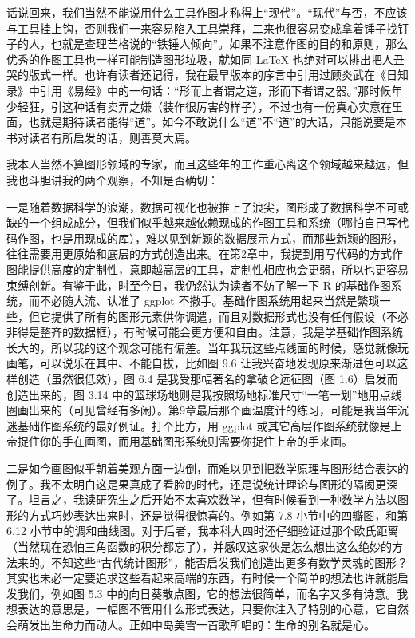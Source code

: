 \documentclass[
  b5paper,
  UTF8,twoside]{book}
\begin{document}
话说回来，我们当然不能说用什么工具作图才称得上``现代''。``现代''与否，不应该与工具挂上钩，否则我们一来容易陷入工具崇拜，二来也很容易变成拿着锤子找钉子的人，也就是查理芒格说的``铁锤人倾向''。如果不注意作图的目的和原则，那么优秀的作图工具也一样可能制造图形垃圾，就如同 LaTeX 也绝对可以排出把人丑哭的版式一样。也许有读者还记得，我在最早版本的序言中引用过顾炎武在《日知录》中引用《易经》中的一句话：``形而上者谓之道，形而下者谓之器。''那时候年少轻狂，引这种话有卖弄之嫌（装作很厉害的样子），不过也有一份真心实意在里面，也就是期待读者能得``道''。如今不敢说什么``道''不``道''的大话，只能说要是本书对读者有所启发的话，则善莫大焉。

我本人当然不算图形领域的专家，而且这些年的工作重心离这个领域越来越远，但我也斗胆讲我的两个观察，不知是否确切：

一是随着数据科学的浪潮，数据可视化也被推上了浪尖，图形成了数据科学不可或缺的一个组成成分，但我们似乎越来越依赖现成的作图工具和系统（哪怕自己写代码作图，也是用现成的库），难以见到新颖的数据展示方式，而那些新颖的图形，往往需要用更原始和底层的方式创造出来。在第2章中，我提到用写代码的方式作图能提供高度的定制性，意即越高层的工具，定制性相应也会更弱，所以也更容易束缚创新。有鉴于此，时至今日，我仍然认为读者不妨了解一下 R 的基础作图系统，而不必随大流、认准了 ggplot 不撒手。基础作图系统用起来当然是繁琐一些，但它提供了所有的图形元素供你调遣，而且对数据形式也没有任何假设（不必非得是整齐的数据框），有时候可能会更方便和自由。注意，我是学基础作图系统长大的，所以我的这个观念可能有偏差。当年我玩这些点线面的时候，感觉就像玩画笔，可以说乐在其中、不能自拔，比如图 9.6 让我兴奋地发现原来渐进色可以这样创造（虽然很低效），图 6.4 是我受那幅著名的拿破仑远征图（图 1.6）启发而创造出来的，图 3.14 中的篮球场地则是我按照场地标准尺寸``一笔一划''地用点线圈画出来的（可见曾经有多闲）。第9章最后那个画温度计的练习，可能是我当年沉迷基础作图系统的最好例证。打个比方，用 ggplot 或其它高层作图系统就像是上帝捉住你的手在画图，而用基础图形系统则需要你捉住上帝的手来画。

二是如今画图似乎朝着美观方面一边倒，而难以见到把数学原理与图形结合表达的例子。我不太明白这是果真成了看脸的时代，还是说统计理论与图形的隔阂更深了。坦言之，我读研究生之后开始不太喜欢数学，但有时候看到一种数学方法以图形的方式巧妙表达出来时，还是觉得很惊喜的。例如第 7.8 小节中的四瓣图，和第 6.12 小节中的调和曲线图。对于后者，我本科大四时还仔细验证过那个欧氏距离（当然现在恐怕三角函数的积分都忘了），并感叹这家伙是怎么想出这么绝妙的方法来的。不知这些``古代统计图形''，能否启发我们创造出更多有数学灵魂的图形？其实也未必一定要追求这些看起来高端的东西，有时候一个简单的想法也许就能启发我们，例如图 5.3 中的向日葵散点图，它的想法很简单，而名字又多有诗意。我想表达的意思是，一幅图不管用什么形式表达，只要你注入了特别的心意，它自然会萌发出生命力而动人。正如中岛美雪一首歌所唱的：生命的别名就是心。
\end{document}

